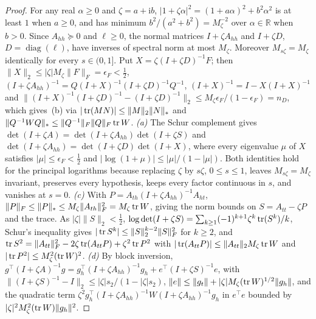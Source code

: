 \begin{proof}
For any real $\alpha\ge0$ and $\zeta=a+\mathrm ib$, $|1+\zeta\alpha|^2=(1+a\alpha)^2+b^2\alpha^2$ is at least $1$ when
$a\ge0$, and has minimum $b^2/(a^2+b^2)=M_\zeta^{-2}$ over $\alpha\in\mathbb R$ when $b>0$. Since $A_{hh}\succeq0$ and
$\ell\ge0$, the normal matrices $I+\zeta A_{hh}$ and $I+\zeta D$, $D=\operatorname{diag}(\ell)$, have inverses of
spectral norm at most $M_\zeta$. Moreover $M_{s\zeta}=M_\zeta$ identically for every $s\in(0,1]$. Put
$X=\zeta(I+\zeta D)^{-1}F$; then $\|X\|_2\le|\zeta|M_\zeta\|F\|_F=\epsilon_F<\frac12$,
$(I+\zeta A_{hh})^{-1}=Q(I+X)^{-1}(I+\zeta D)^{-1}Q^{-1}$, $(I+X)^{-1}=I-X(I+X)^{-1}$ and
$\|(I+X)^{-1}(I+\zeta D)^{-1}-(I+\zeta D)^{-1}\|_2\le M_\zeta\epsilon_F/(1-\epsilon_F)=n_D$, which gives~(b) via
$|\operatorname{tr}(MN)|\le\|M\|_2\|N\|_*$ and $\|Q^{-1}WQ\|_*\le\|Q^{-1}\|_F\|Q\|_F\operatorname{tr} W$. \emph{(a)} The Schur complement gives
$\det(I+\zeta A)=\det(I+\zeta A_{hh})\det(I+\zeta S)$ and $\det(I+\zeta A_{hh})=\det(I+\zeta D)\det(I+X)$, where every
eigenvalue $\mu$ of $X$ satisfies $|\mu|\le\epsilon_F<\frac12$ and $|\log(1+\mu)|\le|\mu|/(1-|\mu|)$. Both identities
hold for the principal logarithms because replacing $\zeta$ by $s\zeta$, $0\le s\le1$, leaves $M_{s\zeta}=M_\zeta$
invariant, preserves every hypothesis, keeps every factor continuous in $s$, and vanishes at $s=0$. \emph{(c)} With
$P=A_{th}(I+\zeta A_{hh})^{-1}A_{ht}$, $\|P\|_F\le\|P\|_*\le M_\zeta\|A_{th}\|_F^2=M_\zeta\operatorname{tr} W$, giving the norm bounds
on $S=A_{tt}-\zeta P$ and the trace. As $|\zeta|\|S\|_2<\frac12$,
$\log\det(I+\zeta S)=\sum_{k\ge1}(-1)^{k+1}\zeta^k\operatorname{tr}(S^k)/k$, Schur's inequality gives $|\operatorname{tr} S^k|\le\|S\|_2^{k-2}\|S\|_F^2$
for $k\ge2$, and $\operatorname{tr} S^2=\|A_{tt}\|_F^2-2\zeta\operatorname{tr}(A_{tt}P)+\zeta^2\operatorname{tr} P^2$ with
$|\operatorname{tr}(A_{tt}P)|\le\|A_{tt}\|_2M_\zeta\operatorname{tr} W$ and $|\operatorname{tr} P^2|\le M_\zeta^2(\operatorname{tr} W)^2$. \emph{(d)} By block inversion,
$g^\top(I+\zeta A)^{-1}g=g_h^\top(I+\zeta A_{hh})^{-1}g_h+e^\top(I+\zeta S)^{-1}e$, with
$\|(I+\zeta S)^{-1}-I\|_2\le|\zeta|s_2/(1-|\zeta|s_2)$, $\|e\|\le\|g_t\|+|\zeta|M_\zeta(\operatorname{tr} W)^{1/2}\|g_h\|$, and the
quadratic term $\zeta^2g_h^\top(I+\zeta A_{hh})^{-1}W(I+\zeta A_{hh})^{-1}g_h$ in $e^\top e$ bounded by
$|\zeta|^2M_\zeta^2(\operatorname{tr} W)\|g_h\|^2$.
\end{proof}

